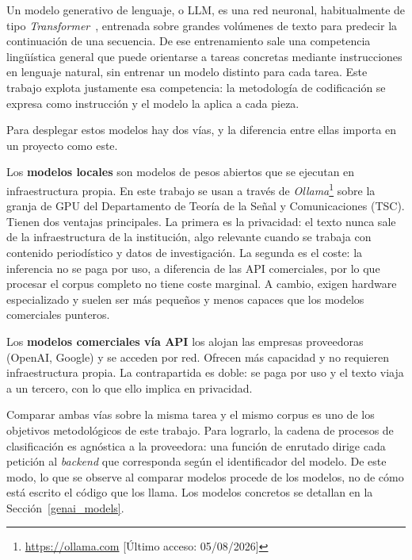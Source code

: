 

Un modelo generativo de lenguaje, o LLM, es una red
neuronal, habitualmente de tipo \textit{Transformer}~\cite{vaswani2017}, entrenada
sobre grandes volúmenes de texto para predecir la continuación de una secuencia. De ese entrenamiento sale una competencia
lingüística general que puede orientarse a tareas concretas mediante
instrucciones en lenguaje natural, sin entrenar un modelo distinto para cada
tarea. Este trabajo explota justamente esa competencia: la metodología de
codificación se expresa como instrucción y el modelo la aplica a cada pieza.

Para desplegar estos modelos hay dos vías, y la diferencia entre ellas importa en
un proyecto como este.

Los \textbf{modelos locales} son modelos de pesos abiertos que se ejecutan en
infraestructura propia. En este trabajo se usan a través de
\textit{Ollama}\footnote{\url{https://ollama.com} [Último acceso: 05/08/2026]} sobre la granja de GPU del
Departamento de Teoría de la Señal y Comunicaciones (TSC). Tienen
dos ventajas principales. La primera es la privacidad: el texto nunca sale de la
infraestructura de la institución, algo relevante cuando se trabaja con contenido
periodístico y datos de investigación. La segunda es el coste: la inferencia no se
paga por uso, a diferencia de las API comerciales, por lo que procesar el corpus
completo no tiene coste marginal. A cambio, exigen hardware especializado y suelen
ser más pequeños y menos capaces que los modelos comerciales punteros.

Los \textbf{modelos comerciales vía API} los alojan las empresas proveedoras (OpenAI,
Google) y se acceden por red. Ofrecen más capacidad y no requieren
infraestructura propia. La contrapartida es doble: se paga por uso y el texto
viaja a un tercero, con lo que ello implica en privacidad.

Comparar ambas vías sobre la misma tarea y el mismo corpus es uno de los
objetivos metodológicos de este trabajo. Para lograrlo, la cadena de procesos de
clasificación es agnóstica a la proveedora: una función de enrutado dirige cada
petición al \textit{backend} que corresponda según el identificador del modelo. De este
modo, lo que se observe al comparar modelos procede de los modelos, no de cómo
está escrito el código que los llama. Los modelos concretos se detallan en la
Sección~\ref{genai_models}.
